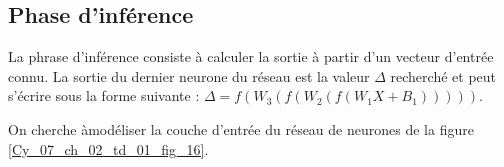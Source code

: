 \subsection*{Phase d'inférence}
%
%
La phrase d'inférence consiste à calculer la sortie à partir d'un vecteur d'entrée connu. La sortie du dernier neurone du réseau est la valeur $\Delta$ recherché et peut s'écrire sous la forme suivante : 
$\Delta = f\left(W_3\left(f\left(W_2\left(f\left(W_1 X + B_1\right)\right)\right)\right)\right)$.
%

\ifprof
\begin{corrige}
\end{corrige}
\else
\fi

On cherche àmodéliser la couche d'entrée du réseau de neurones de la figure \ref{Cy_07_ch_02_td_01_fig_16}. 


